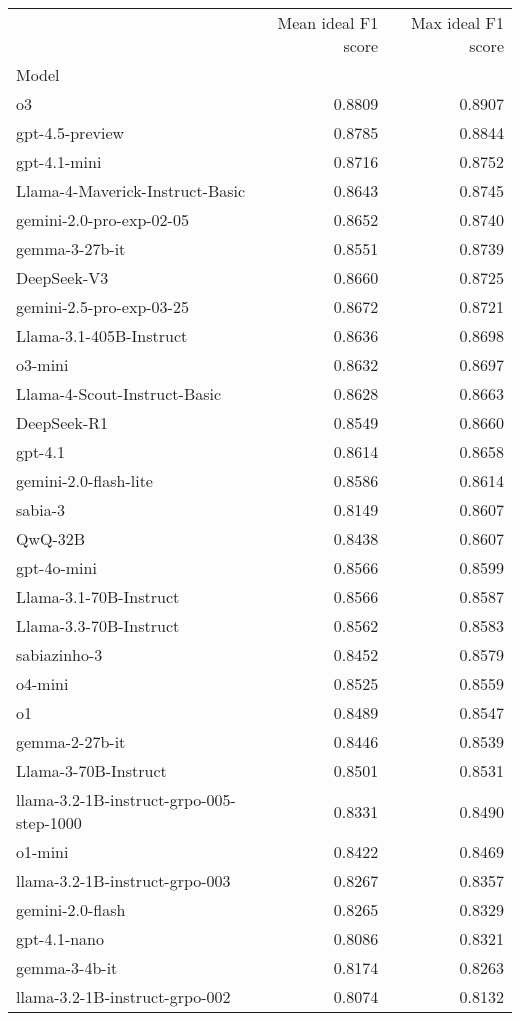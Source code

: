 \begin{tabular}{lrr}
\toprule
 & Mean ideal F1 score & Max ideal F1 score \\
Model &  &  \\
\midrule
o3 & 0.8809 & 0.8907 \\
gpt-4.5-preview & 0.8785 & 0.8844 \\
gpt-4.1-mini & 0.8716 & 0.8752 \\
Llama-4-Maverick-Instruct-Basic & 0.8643 & 0.8745 \\
gemini-2.0-pro-exp-02-05 & 0.8652 & 0.8740 \\
gemma-3-27b-it & 0.8551 & 0.8739 \\
DeepSeek-V3 & 0.8660 & 0.8725 \\
gemini-2.5-pro-exp-03-25 & 0.8672 & 0.8721 \\
Llama-3.1-405B-Instruct & 0.8636 & 0.8698 \\
o3-mini & 0.8632 & 0.8697 \\
Llama-4-Scout-Instruct-Basic & 0.8628 & 0.8663 \\
DeepSeek-R1 & 0.8549 & 0.8660 \\
gpt-4.1 & 0.8614 & 0.8658 \\
gemini-2.0-flash-lite & 0.8586 & 0.8614 \\
sabia-3 & 0.8149 & 0.8607 \\
QwQ-32B & 0.8438 & 0.8607 \\
gpt-4o-mini & 0.8566 & 0.8599 \\
Llama-3.1-70B-Instruct & 0.8566 & 0.8587 \\
Llama-3.3-70B-Instruct & 0.8562 & 0.8583 \\
sabiazinho-3 & 0.8452 & 0.8579 \\
o4-mini & 0.8525 & 0.8559 \\
o1 & 0.8489 & 0.8547 \\
gemma-2-27b-it & 0.8446 & 0.8539 \\
Llama-3-70B-Instruct & 0.8501 & 0.8531 \\
llama-3.2-1B-instruct-grpo-005-step-1000 & 0.8331 & 0.8490 \\
o1-mini & 0.8422 & 0.8469 \\
llama-3.2-1B-instruct-grpo-003 & 0.8267 & 0.8357 \\
gemini-2.0-flash & 0.8265 & 0.8329 \\
gpt-4.1-nano & 0.8086 & 0.8321 \\
gemma-3-4b-it & 0.8174 & 0.8263 \\
llama-3.2-1B-instruct-grpo-002 & 0.8074 & 0.8132 \\

\end{tabular}
